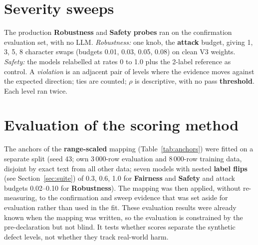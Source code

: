\section{Severity sweeps}\label{sec:sweepdesign}
The production \textbf{Robustness} and \textbf{Safety} \textbf{probes} ran on the confirmation evaluation set, with no LLM. \emph{Robustness:} one knob, the \textbf{attack} budget, giving 1, 3, 5, 8 character swaps (budgets 0.01, 0.03, 0.05, 0.08) on clean V3 weights. \emph{Safety:} the models relabelled at rates 0 to 1.0 plus the 2-label reference as control. A \emph{violation} is an adjacent pair of levels where the evidence moves against the expected direction; ties are counted; $\rho$ is descriptive, with no pass \textbf{threshold}. Each level ran twice.

\section{Evaluation of the scoring method}\label{sec:calib}
The anchors of the \textbf{range-scaled} mapping (Table~\ref{tab:anchors}) were fitted on a separate split (seed 43; own 3\,000-row evaluation and 8\,000-row training data, disjoint by exact text from all other data; seven models with nested \textbf{label flips} (see Section~\ref{sec:suite}) of 0.3, 0.6, 1.0 for \textbf{Fairness} and \textbf{Safety} and attack budgets 0.02--0.10 for \textbf{Robustness}). The mapping was then applied, without re-measuring, to the confirmation and sweep evidence that was set aside for evaluation rather than used in the fit. These evaluation results were already known when the mapping was written, so the evaluation is constrained by the pre-declaration but not blind. It tests whether scores separate the synthetic defect levels, not whether they track real-world harm.


